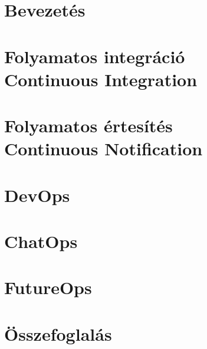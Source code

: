 \documentclass[12pt,a4paper,english,magyar,oneside]{report}
\begin{document}


\setcounter{tocdepth}{2} %
\tableofcontents %
\printnomenclature[2.5cm]

\chapter{Bevezetés}


\chapter{Folyamatos integráció\\\small Continuous Integration}
\label{chap:cont_int}


\chapter{Folyamatos értesítés\\\small Continuous Notification}
\label{chap:cont_not}


\chapter{DevOps}


\chapter{ChatOps}
\label{chapter:chatops}


\chapter{FutureOps}


\chapter{Összefoglalás}


\newpage

\printbibliography


\end{document}
